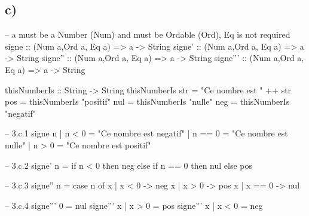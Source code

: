 \documentclass[a4paper,11pt]{report}
\begin{document}
\subsection*{c)}
\begin{haskellcode}
-- a must be a Number (Num) and must be Ordable (Ord), Eq is not required
signe :: (Num a,Ord a, Eq a) => a -> String
signe' :: (Num a,Ord a, Eq a) => a -> String
signe'' :: (Num a,Ord a, Eq a) => a -> String
signe''' :: (Num a,Ord a, Eq a) => a -> String

thisNumberIs :: String -> String
thisNumberIs str = "Ce nombre est " ++ str
pos = thisNumberIs "positif"
nul = thisNumberIs "nulle"
neg = thisNumberIs "negatif"

-- 3.c.1
signe n | n < 0 = "Ce nombre est negatif"
        | n == 0 = "Ce nombre est nulle"
        | n > 0 = "Ce nombre est positif"

-- 3.c.2
signe' n =
  if n < 0 then
    neg
  else if n == 0 then
    nul
  else
    pos

-- 3.c.3
signe'' n = case n of
  x | x < 0 -> neg
  x | x > 0 -> pos
  x | x == 0 -> nul

-- 3.c.4
signe''' 0 = nul
signe''' x | x > 0 = pos
signe''' x | x < 0 = neg
\end{haskellcode}
\end{document}
